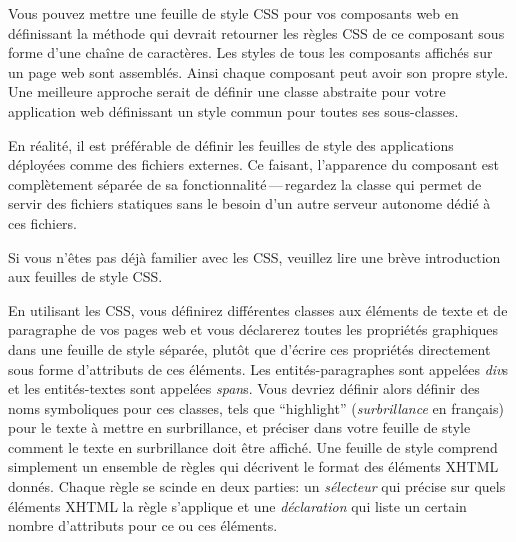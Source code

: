 \documentclass[a4paper,10pt,twoside]{book}
\begin{document}
Vous pouvez mettre une feuille de style CSS pour vos composants web en
définissant la méthode  qui devrait retourner les règles CSS
de ce composant sous forme d'une chaîne de caractères.
Les styles de tous les composants affichés sur un page web sont
assemblés. Ainsi chaque composant peut avoir son propre style.
Une meilleure approche serait de définir une classe abstraite pour
votre application web définissant un style commun pour toutes ses
sous-classes. %

En réalité, il est préférable de définir les feuilles de style des
applications déployées comme des fichiers externes.
Ce faisant, l'apparence du composant est complètement séparée de sa
fonctionnalité\,---\,regardez la classe  qui
permet de servir des fichiers statiques sans le besoin d'un autre
serveur autonome
dédié à ces fichiers.

Si vous n'êtes pas déjà familier avec les CSS, veuillez lire
une brève introduction aux feuilles de style CSS.

En utilisant les CSS, vous définirez différentes classes aux éléments
de texte et de paragraphe de vos pages web et vous déclarerez toutes
les propriétés graphiques dans une feuille de style séparée, plutôt
que d'écrire ces propriétés directement sous forme d'attributs de ces
éléments.
Les entités-paragraphes sont appelées \emph{div}s et les
entités-textes sont appelées \emph{span}s.
Vous devriez définir alors définir des noms symboliques pour ces
classes, tels que ``highlight'' (\emph{surbrillance} en français) pour
le texte à mettre en surbrillance, et préciser dans votre feuille de
style comment le texte en surbrillance doit être affiché.
Une feuille de style comprend simplement un ensemble de règles qui
décrivent le format des éléments XHTML donnés. 
Chaque règle se scinde en deux parties: un \emph{sélecteur} qui
précise sur quels éléments XHTML la règle s'applique et une
\emph{déclaration} qui liste un certain nombre d'attributs pour ce ou
ces éléments.
\end{document}
